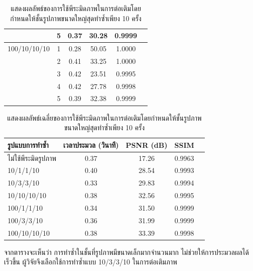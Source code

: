 \documentclass[hidelinks, a4paper,12pt]{article}
\numberwithin{equation}{section}							%
\numberwithin{equation}{section}
\begin{document}
{\begin{table}[H]
\begin{tabular}[ht]{|l|c|c|c|c|c|}
			& 5 & 0.37 & 30.28 & 0.9999 \\
			\hline
			100/10/10/10  & 1 & 0.28 & 50.05 &  1.0000\\
			& 2 & 0.41 & 33.25 &  1.0000\\
			& 3 & 0.42 & 23.51 & 0.9995 \\
			& 4 & 0.42 & 27.78 & 0.9998 \\
			& 5 & 0.39 & 32.38 & 0.9999 \\
			\hline
		\end{tabular}
		\caption{แสดงผลลัพธ์ของการใช้พีระมิดภาพในการต่อเติมโดยกำหนดให้ชั้นรูปภาพขนาดใหญ่สุดทำซ้ำเพียง 10 ครั้ง}
	\end{table}	
	\begin{table}[H]
		\centering
		\begin{tabular}[ht]{|l|c|c|c|c|}
			\hline
			รูปแบบการทำซ้ำ  & เวลาประมวล  (วินาที) & PSNR (dB) & SSIM \\
			\hline
			ไม่ใช้พีระมิดรูปภาพ & 0.37 & 17.26 & 0.9963  \\
			10/1/1/10 & 0.40 & 28.54 & 0.9993 \\
			10/3/3/10 & 0.33 & 29.83  & 0.9994 \\
			10/10/10/10 & 0.38 & 32.56 & 0.9995 \\
			100/1/1/10 & 0.34 & 31.50 & 0.9999 \\
			100/3/3/10 & 0.36 & 31.99 & 0.9999 \\
			100/10/10/10 & 0.38 & 33.39 & 0.9998 \\
			\hline
		\end{tabular}
		\caption{แสดงผลลัพธ์เฉลี่ยของการใช้พีระมิดภาพในการต่อเติมโดยกำหนดให้ชั้นรูปภาพขนาดใหญ่สุดทำซ้ำเพียง 10 ครั้ง}
	\end{table}	

	\hspace{1cm}จากตารางจะเห็นว่า การทำซ้ำในชั้นที่รูปภาพมีขนาดเล็กมากจำนวนมาก ไม่ช่วยให้การประมวลผลได้เร็วขึ้น ผู้วิจัยจึงเลือกใช้การทำซ้ำแบบ 10/3/3/10 ในการต่อเติมภาพ
	
}
\end{document}
